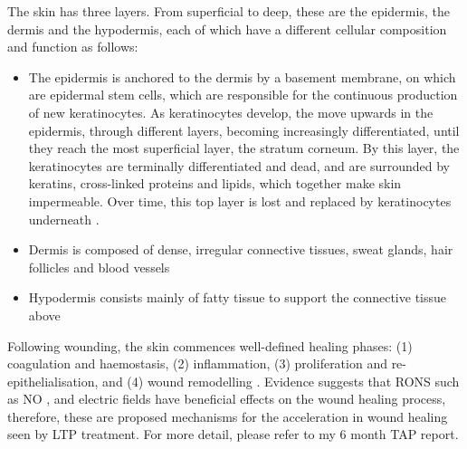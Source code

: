 \documentclass[11pt, oneside]{article}   	%
\newcommand{\todo}[1]{ \textcolor{red}{\bf{To Do:} #1}}
\newcommand{\toref}[1]{ \textcolor{blue}{\bf{REFERENCE #1}}}
\begin{document}
The skin has three layers.
From superficial to deep, these are the epidermis, the dermis and the hypodermis, each of which have a different cellular composition and function as follows: %
\begin{itemize}
\item The epidermis is anchored to the dermis by a basement membrane, on which are epidermal stem cells, which are responsible for the continuous production of new keratinocytes.
As keratinocytes develop, the move upwards in the epidermis, through different layers, becoming increasingly differentiated, until they reach the most superficial layer, the stratum corneum. 
By this layer, the keratinocytes are terminally differentiated and dead, and are surrounded by keratins, cross-linked proteins and lipids, which together make skin impermeable.
Over time, this top layer is lost and replaced by keratinocytes underneath \cite{Mancini2014micro}.
\item Dermis is composed of dense, irregular connective tissues, sweat glands, hair follicles and blood vessels \cite{Mancini2014micro}
\item Hypodermis consists mainly of fatty tissue to support the connective tissue above \cite{Mancini2014micro}
\end{itemize}

Following wounding, the skin commences well-defined healing phases: (1) coagulation and haemostasis, (2) inflammation, (3) proliferation and re-epithelialisation, and (4) wound remodelling \cite{Velnar2009the}.
Evidence suggests that RONS such as NO \cite{Shekhter2005beneficial}, and electric fields \cite{Thakral2013electrical, Messerli2011extracellular} have beneficial effects on the wound healing process, therefore, these are proposed mechanisms for the acceleration in wound healing seen by LTP treatment.
For more detail, please refer to my 6 month TAP report.
\end{document}
